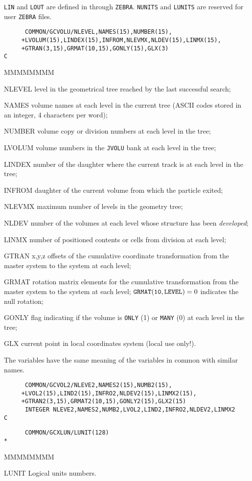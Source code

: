 {\tt LIN} and {\tt LOUT} are defined in  through {\tt ZEBRA}.
{\tt NUNITS} and {\tt LUNITS} are reserved
for user {\tt ZEBRA} files.
\begin{verbatim}
      COMMON/GCVOLU/NLEVEL,NAMES(15),NUMBER(15),
     +LVOLUM(15),LINDEX(15),INFROM,NLEVMX,NLDEV(15),LINMX(15),
     +GTRAN(3,15),GRMAT(10,15),GONLY(15),GLX(3)
C
\end{verbatim}
\begin{DLtt}{MMMMMMMM}
\item[NLEVEL] level in the geometrical tree reached by the last 
successful search;
\item[NAMES]volume names at each level in the current tree
(ASCII codes stored in an integer, 4 characters per word);
\item[NUMBER]volume copy or division numbers at each level in the tree;
\item[LVOLUM]volume numbers in the {\tt JVOLU} bank at each level in the tree;
\item[LINDEX]number of the daughter where the current track is at each 
level in the tree;
\item[INFROM] daughter of the current volume from which the particle
exited;
\item[NLEVMX] maximum number of levels in the geometry tree;
\item[NLDEV] number of the volumes at each level whose structure has
been {\it developed};
\item[LINMX] number of positioned contents or cells from division at
each level;
\item[GTRAN]x,y,z offsets of the cumulative coordinate
transformation from the master system to the system at each level;
\item[GRMAT]rotation matrix elements for the cumulative
transformation from the master system to the system at each level;
${\tt GRMAT(10,LEVEL)}=0$ indicates the null rotation;
\item[GONLY] flag indicating if the volume is {\tt ONLY} (1) or
{\tt MANY} (0) at each level in the tree;
\item[GLX]current point in local coordinates system (local use only!).
\end{DLtt}
The variables have the same meaning of the variables in common 
with similar names. 
\begin{verbatim}
      COMMON/GCVOL2/NLEVE2,NAMES2(15),NUMB2(15),
     +LVOL2(15),LIND2(15),INFRO2,NLDEV2(15),LINMX2(15),
     +GTRAN2(3,15),GRMAT2(10,15),GONLY2(15),GLX2(15)
      INTEGER NLEVE2,NAMES2,NUMB2,LVOL2,LIND2,INFRO2,NLDEV2,LINMX2
C
\end{verbatim}
\begin{verbatim}
      COMMON/GCXLUN/LUNIT(128)
*
\end{verbatim}
\begin{DLtt}{MMMMMMMM}
\item[LUNIT]Logical units numbers.
\end{DLtt}

